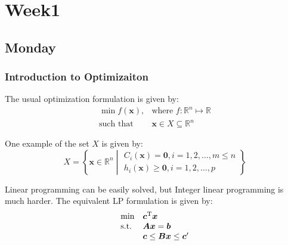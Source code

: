 
\chapter{Week1}

\section{Monday}
\subsection{Introduction to Optimizaiton}
The usual optimization formulation is given by:
\[\begin{array}{ll}
\min f(\bm x),
&
\mbox{where }f:\mathbb{R}^n\mapsto\mathbb{R}
\\
\mbox{such that}
&
\bm x\in X\subseteq\mathbb{R}^n
\end{array}
\]

One example of the set $X$ is given by:
\[
X=\left\{\bm x\in\mathbb{R}^n\middle|
\begin{array}{l}
C_i(\bm x) = \bm0, i=1,2,\dots,m\le n
 \\
 h_i(\bm x)\ge\bm0, i=1,2,\dots,p
\end{array}\right\}
\]

Linear programming can be easily solved, but Integer linear programming is much harder. The equivalent LP formulation is given by:
\[
\begin{array}{ll}
\min
&
\bm c^{\mathrm T}\bm x
\\
\mbox{s.t.}
&
\bm{Ax}=\bm b
\\
&
\bm c\le\bm{Bx}\le \bm c'
\end{array}
\]










